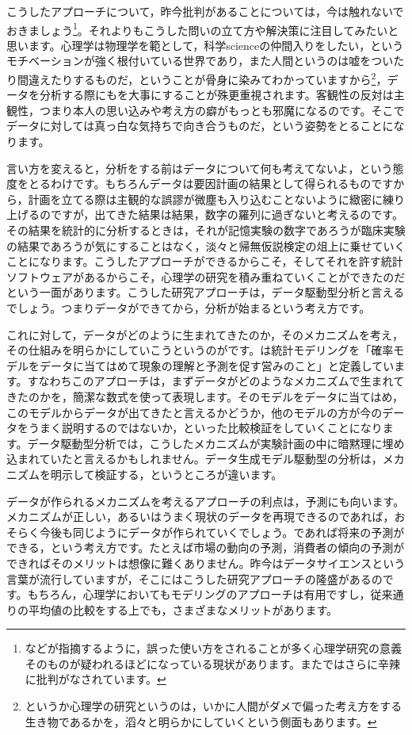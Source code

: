 \documentclass{ltjsbook}
\begin{document}
こうしたアプローチについて，昨今批判があることについては，今は触れないでおきましょう\footnote{\textcite{amrhein2019scientists}などが指摘するように，誤った使い方をされることが多く心理学研究の意義そのものが疑われるほどになっている現状があります。また\textcite{Toyoda202003}ではさらに辛辣に批判がなされています。}。それよりもこうした問いの立て方や解決策に注目してみたいと思います。心理学は物理学を範として，科学scienceの仲間入りをしたい，というモチベーションが強く根付いている世界であり，また人間というのは嘘をついたり間違えたりするものだ，ということが骨身に染みてわかっていますから\footnote{というか心理学の研究というのは，いかに人間がダメで偏った考え方をする生き物であるかを，滔々と明らかにしていくという側面もあります。}，データを分析する際にもを大事にすることが殊更重視されます。客観性の反対は主観性，つまり本人の思い込みや考え方の癖がもっとも邪魔になるのです。そこでデータに対しては真っ白な気持ちで向き合うものだ，という姿勢をとることになります。

言い方を変えると，分析をする前はデータについて何も考えてないよ，という態度をとるわけです。もちろんデータは要因計画の結果として得られるものですから，計画を立てる際は主観的な誤謬が微塵も入り込むことないように緻密に練り上げるのですが，出てきた結果は結果，数字の羅列に過ぎないと考えるのです。その結果を統計的に分析するときは，それが記憶実験の数字であろうが臨床実験の結果であろうが気にすることはなく，淡々と帰無仮説検定の俎上に乗せていくことになります。こうしたアプローチができるからこそ，そしてそれを許す統計ソフトウェアがあるからこそ，心理学の研究を積み重ねていくことができたのだという一面があります。こうした研究アプローチは，データ駆動型分析と言えるでしょう。つまりデータができてから，分析が始まるという考え方です。

これに対して，データがどのように生まれてきたのか，そのメカニズムを考え，その仕組みを明らかにしていこうというのがです。\textcite{Matsuura201610}は統計モデリングを「確率モデルをデータに当てはめて現象の理解と予測を促す営みのこと」と定義しています。すなわちこのアプローチは，まずデータがどのようなメカニズムで生まれてきたのかを，簡潔な数式を使って表現します。そのモデルをデータに当てはめ，このモデルからデータが出てきたと言えるかどうか，他のモデルの方が今のデータをうまく説明するのではないか，といった比較検証をしていくことになります。データ駆動型分析では，こうしたメカニズムが実験計画の中に暗黙理に埋め込まれていたと言えるかもしれません。データ生成モデル駆動型の分析は，メカニズムを明示して検証する，というところが違います。

データが作られるメカニズムを考えるアプローチの利点は，予測にも向います。メカニズムが正しい，あるいはうまく現状のデータを再現できるのであれば，おそらく今後も同じようにデータが作られていくでしょう。であれば将来の予測ができる，という考え方です。たとえば市場の動向の予測，消費者の傾向の予測ができればそのメリットは想像に難くありません。昨今はデータサイエンスという言葉が流行していますが，そこにはこうした研究アプローチの隆盛があるのです。もちろん，心理学においてもモデリングのアプローチは有用ですし，従来通りの平均値の比較をする上でも，さまざまなメリットがあります。
\end{document}
